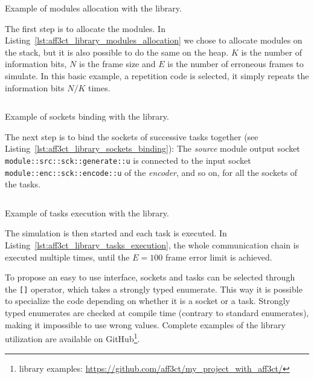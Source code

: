 \begin{listing}[htp]
  \inputminted[frame=lines,linenos]{C++}{\curChapter/src/use_cases/library/modules_allocation.cpp}
  \caption{Example of modules allocation with the \AFFECT library.}
  \label{lst:aff3ct_library_modules_allocation}
\end{listing}

The first step is to allocate the modules. In
Listing~\ref{lst:aff3ct_library_modules_allocation} we chose to allocate modules
on the stack, but it is also possible to do the same on the heap. $K$ is the
number of information bits, $N$ is the frame size and $E$ is the number of
erroneous frames to simulate. In this basic example, a repetition code is
selected, it simply repeats the information bits $N/K$ times.

\begin{listing}[htp]
  \inputminted[frame=lines,linenos]{C++}{\curChapter/src/use_cases/library/sockets_binding.cpp}
  \caption{Example of sockets binding with the \AFFECT library.}
  \label{lst:aff3ct_library_sockets_binding}
\end{listing}

The next step is to bind the sockets of successive tasks together (see
Listing~\ref{lst:aff3ct_library_sockets_binding}): The \textit{source} module
output socket \verb|module::src::sck::generate::u| is connected to the input
socket \verb|module::enc::sck::encode::u| of the \textit{encoder}, and so
on, for all the sockets of the tasks.

\begin{listing}[htp]
  \inputminted[frame=lines,linenos]{C++}{\curChapter/src/use_cases/library/tasks_execution.cpp}
  \caption{Example of tasks execution with the \AFFECT library.}
  \label{lst:aff3ct_library_tasks_execution}
\end{listing}

The simulation is then started and each task is executed. In
Listing~\ref{lst:aff3ct_library_tasks_execution}, the whole communication chain
is executed multiple times, until the $E = 100$ frame error limit is achieved.

To propose an easy to use interface, sockets and tasks can be selected through
the \verb|[]| operator, which takes a \Cxx strongly typed enumerate. This way it
is possible to specialize the code depending on whether it is a socket or a
task. Strongly typed enumerates are checked at compile time (contrary to
standard enumerates), making it impossible to use wrong values. Complete
examples of the \AFFECT library utilization are available on
GitHub\footnote{\AFFECT library examples: \url{https://github.com/aff3ct/my_project_with_aff3ct/}}.

